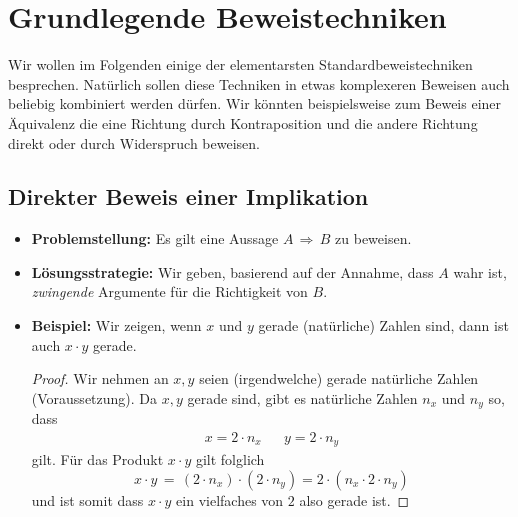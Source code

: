 \section{Grundlegende Beweistechniken}

Wir wollen im Folgenden einige der elementarsten Standardbeweistechniken besprechen. Natürlich sollen diese Techniken in etwas komplexeren Beweisen auch beliebig kombiniert werden dürfen. Wir könnten beispielsweise zum Beweis einer Äquivalenz die eine Richtung durch Kontraposition und die andere Richtung direkt oder durch Widerspruch beweisen.

\subsection*{Direkter Beweis einer Implikation}
\begin{itemize}
 \item[] \textbf{Problemstellung:} Es gilt eine Aussage $A\,\Rightarrow \, B$ zu beweisen.
\item[] \textbf{Lösungsstrategie:} Wir geben, basierend auf der Annahme, dass $A$ wahr ist, \textit{zwingende} Argumente für die Richtigkeit von $B$.
\item[]\textbf{Beispiel:} Wir zeigen, wenn $x$ und $y$ gerade (natürliche) Zahlen sind, dann ist auch $x\cdot y$ gerade.
\begin{proof}
Wir nehmen an $x,y$ seien (irgendwelche) gerade natürliche Zahlen (Voraussetzung). Da $x,y$ gerade sind, gibt es natürliche Zahlen $n_x$ und $n_y$ so, dass
\begin{align*}
x=2\cdot n_x&&y=2\cdot n_y
\end{align*}
gilt. Für das Produkt $x\cdot y$ gilt folglich
\[
x\cdot y \,=\, (2\cdot n_x)\cdot(2\cdot n_y)=2\cdot(n_x\cdot 2\cdot n_y)
\]
und ist somit dass $x\cdot y$ ein vielfaches von $2$ also gerade ist.
\end{proof}
\end{itemize}

